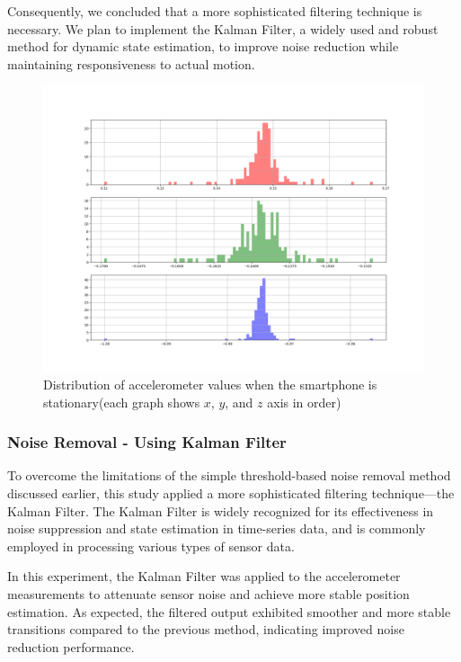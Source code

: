 \documentclass{article}
\begin{document}
Consequently, we concluded that a more sophisticated filtering technique is necessary. We plan to implement the Kalman Filter, a widely used and robust method for dynamic state estimation, to improve noise reduction while maintaining responsiveness to actual motion.

\FloatBarrier
\begin{figure}[h]
    \centering
    \includegraphics[width=\textwidth]{2_1_7_1.png}
    \caption{Distribution of accelerometer values when the smartphone is stationary(each graph shows $x$, $y$, and $z$ axis in order)}
    \label{fig:accel_histogram}
\end{figure}

\FloatBarrier
\subsubsection{Noise Removal - Using Kalman Filter}
To overcome the limitations of the simple threshold-based noise removal method discussed earlier, this study applied a more sophisticated filtering technique—the Kalman Filter. The Kalman Filter is widely recognized for its effectiveness in noise suppression and state estimation in time-series data, and is commonly employed in processing various types of sensor data.

In this experiment, the Kalman Filter was applied to the accelerometer measurements to attenuate sensor noise and achieve more stable position estimation. As expected, the filtered output exhibited smoother and more stable transitions compared to the previous method, indicating improved noise reduction performance.
\end{document}
